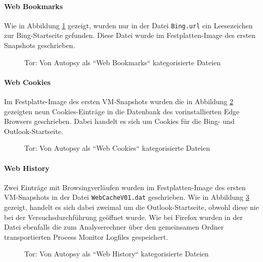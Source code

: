 \begin{appendices}
		\paragraph*{Web Bookmarks}
		Wie in Abbildung \ref{img:tor-web-bookmarks} gezeigt, wurden nur in der Datei \texttt{Bing.url} ein Leesezeichen zur Bing-Startseite gefunden. Diese Datei wurde im Festplatten-Image des ersten Snapshots geschrieben.
		\begin{figure}[h!]
			\centerline{} 
			\caption{Tor: Von Autopsy als ``Web Bookmarks`` kategorisierte Dateien}
			\label{img:tor-web-bookmarks} 
		\end{figure}
		
		\paragraph*{Web Cookies}
		Im Festplatte-Image des ersten VM-Snapshots wurden die in Abbildung \ref{img:tor-web-cookies} gezeigten neun Cookies-Einträge in die Datenbank des vorinstallierten Edge Browsers geschrieben. Dabei handelt es sich um Cookies für die Bing- und Outlook-Startseite.
		\begin{figure}[h!]
			\centerline{} 
			\caption{Tor: Von Autopsy als ``Web Cookies`` kategorisierte Dateien}
			\label{img:tor-web-cookies} 
		\end{figure}
		
		\paragraph*{Web History}
		Zwei Einträge mit Browsingverläufen wurden im Festplatten-Image des ersten VM-Snapshots in der Datei \texttt{WebCacheV01.dat} geschrieben. Wie in Abbildung \ref{img:tor-web-history} gezeigt, handelt es sich dabei zweimal um die Outlook-Startseite, obwohl diese nie bei der Versuchsdurchführung geöffnet wurde. Wie bei Firefox wurden in der Datei ebenfalls die zum Analyserechner über den gemeinsamen Ordner transportierten Process Monitor Logfiles gespeichert.
		\begin{figure}[h!]
			\centerline{}
			\caption{Tor: Von Autopsy als ``Web History`` kategorisierte Dateien}
			\label{img:tor-web-history}  
		\end{figure}
		

\end{appendices}
